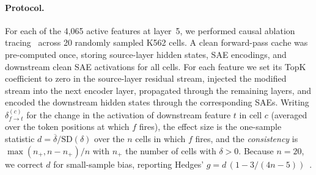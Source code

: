 \documentclass[11pt,onecolumn]{article}
\begin{document}
\paragraph{Protocol.}
For each of the 4{,}065 active features at layer~5, we performed causal ablation tracing~\citep{pearl2009causality,vig2020causal,geiger2021causal} across 20 randomly sampled K562 cells. A clean forward-pass cache was pre-computed once, storing source-layer hidden states, SAE encodings, and downstream clean SAE activations for all cells. For each feature we set its TopK coefficient to zero in the source-layer residual stream, injected the modified stream into the next encoder layer, propagated through the remaining layers, and encoded the downstream hidden states through the corresponding SAEs. Writing $\delta_{f\to t}^{(c)}$ for the change in the activation of downstream feature $t$ in cell $c$ (averaged over the token positions at which $f$ fires), the effect size is the one-sample statistic $d = \overline{\delta}/\mathrm{SD}(\delta)$ over the $n$ cells in which $f$ fires, and the \emph{consistency} is $\max(n_+, n-n_+)/n$ with $n_+$ the number of cells with $\delta>0$. Because $n=20$, we correct $d$ for small-sample bias, reporting Hedges' $g = d\,(1 - 3/(4n-5))$~\citep{hedges1981distribution}.
\end{document}
